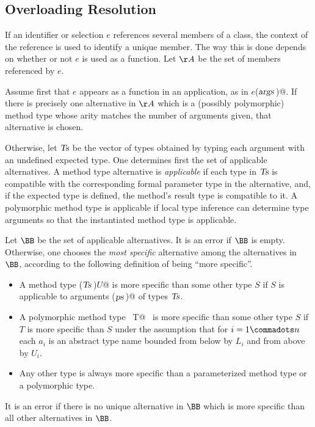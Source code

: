 \subsection{Overloading Resolution}
\label{sec:overloading-resolution}

If an identifier or selection $e$ references several members of a
class, the context of the reference is used to identify a unique
member.  The way this is done depends on whether or not $e$ is used as
a function.  Let $\AA$ be the set of members referenced by $e$.

Assume first that $e$ appears as a function in an application, as
in \lstinline@$e$($\mbox{\sl args}\,$)@.  If there is precisely one alternative in
$\AA$ which is a (possibly polymorphic) method type whose arity
matches the number of arguments given, that alternative is chosen.

Otherwise, let $\mbox{\sl Ts}$ be the vector of types obtained by
typing each argument with an undefined expected type. One determines
first the set of applicable alternatives. A method type alternative is
{\em applicable} if each type in $\mbox{\sl Ts}$ is compatible with
the corresponding formal parameter type in the alternative, and, if 
the expected type is defined, the method's result type is compatible to
it.  A polymorphic method type is applicable if local type inference
can determine type arguments so that the instantiated method type is
applicable.

Let $\BB$ be the set of applicable alternatives. It is an error if
$\BB$ is empty. Otherwise, one chooses the {\em most specific}
alternative among the alternatives in $\BB$, according to the
following definition of being ``more specific''.
\begin{itemize} 
\item
A method type \lstinline@($\mbox{\sl Ts}\,$)$U$@ is more specific than some other
type $S$ if $S$ is applicable to arguments \lstinline@($\mbox{\sl ps}\,$)@ of
types $\mbox{\sl Ts}$.
\item
A polymorphic method type
~\lstinline@[$a_1$ >: $L_1$ <: $U_1 \commadots a_n$ >: $L_n$ <: $U_n$]T@~ is
more specific than some other type $S$ if $T$ is more
specific than $S$ under the assumption that for
$i = 1 \commadots n$ each $a_i$ is an abstract type name
bounded from below by $L_i$ and from above by $U_i$.
\item
Any other type is always more specific than a parameterized method
type or a polymorphic type.
\end{itemize}
It is an error if there is no unique alternative in $\BB$ which is
more specific than all other alternatives in $\BB$.

